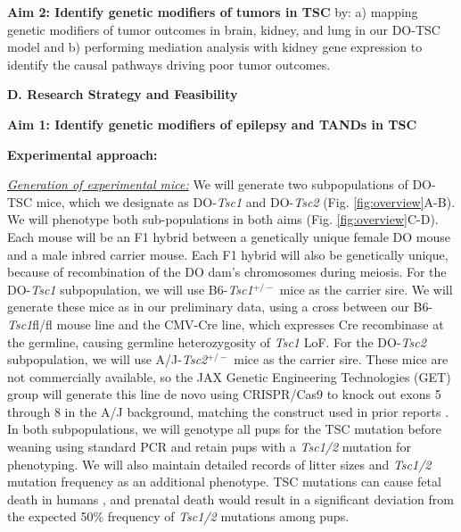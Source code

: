 \documentclass[
  12pt,
]{article}
\begin{document}
\textbf{Aim 2: Identify genetic modifiers of tumors in TSC} by: a)
mapping genetic modifiers of tumor outcomes in brain, kidney, and lung
in our DO-TSC model and b) performing mediation analysis with kidney
gene expression to identify the causal pathways driving poor tumor
outcomes.

\pagebreak

\textbf{D. Research Strategy and Feasibility}

\textbf{Aim 1: Identify genetic modifiers of epilepsy and TANDs in TSC}

\textbf{Experimental approach:}

\textit{\underline{Generation of experimental mice:}} We will generate
two subpopulations of DO-TSC mice, which we designate as
DO-\textit{Tsc1} and DO-\textit{Tsc2} (Fig. \ref{fig:overview}A-B). We
will phenotype both sub-populations in both aims (Fig.
\ref{fig:overview}C-D). Each mouse will be an F1 hybrid between a
genetically unique female DO mouse and a male inbred carrier mouse. Each
F1 hybrid will also be genetically unique, because of recombination of
the DO dam's chromosomes during meiosis. For the DO-\textit{Tsc1}
subpopulation, we will use B6-\textit{Tsc1}\(^{+/-}\) mice as the
carrier sire. We will generate these mice as in our preliminary data,
using a cross between our B6-\textit{Tsc1}fl/fl mouse line and the
CMV-Cre line, which expresses Cre recombinase at the germline, causing
germline heterozygosity of \textit{Tsc1} LoF. For the DO-\textit{Tsc2}
subpopulation, we will use A/J-\textit{Tsc2}\(^{+/-}\) mice as the
carrier sire. These mice are not commercially available, so the JAX
Genetic Engineering Technologies (GET) group will generate this line de
novo using CRISPR/Cas9 to knock out exons 5 through 8 in the A/J
background, matching the construct used in prior reports
\cite{10491404, 20235887}. In both subpopulations, we will genotype all
pups for the TSC mutation before weaning using standard PCR and retain
pups with a \textit{Tsc1/2} mutation for phenotyping. We will also
maintain detailed records of litter sizes and \textit{Tsc1/2} mutation
frequency as an additional phenotype. TSC mutations can cause fetal
death in humans \cite{15731990, 28868251, 18236061}, and prenatal death
would result in a significant deviation from the expected 50\% frequency
of \textit{Tsc1/2} mutations among pups.
\end{document}
